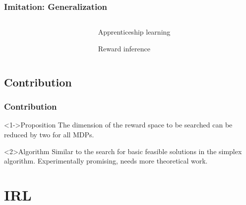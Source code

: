 \documentclass{beamer}
\begin{document}
\begin{frame}
\frametitle{Imitation: Generalization}
\label{sec-1_1_3}
\begin{columns}
\begin{column}{.4\textwidth}
\label{sec-1_1_3_1}

\end{column}
\begin{column}{.4\textwidth}
\begin{block}{Apprenticeship learning}
\label{sec-1_1_3_2}

     Reward inference
\end{block}
\end{column}
\end{columns}
\end{frame}
\subsection{Contribution}
\label{sec-1_2}
\begin{frame}
\frametitle{Contribution}
\label{sec-1_2_1}

\begin{block}<1->{Proposition}
  The dimension of the reward space to be searched can be reduced by two for all MDPs.
\end{block}
\begin{block}<2>{Algorithm}
  Similar to the search for basic feasible solutions in the simplex algorithm. Experimentally promising, needs more theoretical work.
\end{block}
\end{frame}
\section{IRL}
\label{sec-2}
\end{document}
